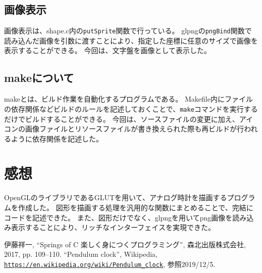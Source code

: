 \documentclass[a4j,titlepage]{jsarticle}
\begin{document}
\subsection{画像表示}
画像表示は、shape.c内の\texttt{putSprite}関数で行っている。
glpngの\texttt{pngBind}関数で読み込んだ画像を引数に渡すことにより、指定した座標に任意のサイズで画像を表示することができる。
今回は、文字盤を画像として表示した。

\subsection{makeについて}
makeとは、ビルド作業を自動化するプログラムである。
Makefile内にファイルの依存関係などビルドのルールを記述しておくことで、\texttt{make}コマンドを実行するだけでビルドすることができる。
今回は、ソースファイルの変更に加え、アイコンの画像ファイルとリソースファイルが書き換えられた際も再ビルドが行われるように依存関係を記述した。


\section{感想}
OpenGLのライブラリであるGLUTを用いて、アナログ時計を描画するプログラムを作成した。
図形を描画する処理を汎用的な関数にまとめることで、完結にコードを記述できた。
また、図形だけでなく、glpngを用いてpng画像を読み込み表示することにより、リッチなインターフェイスを実現できた。


\begin{thebibliography}{9}
   伊藤祥一, ``Springs of C 楽しく身につくプログラミング'', 森北出版株式会社, 2017, pp. 109--110.
   ``Pendulum clock'', Wikipedia, \texttt{\url{https://en.wikipedia.org/wiki/Pendulum_clock}}, 参照2019/12/5.
\end{thebibliography}
\end{document}
